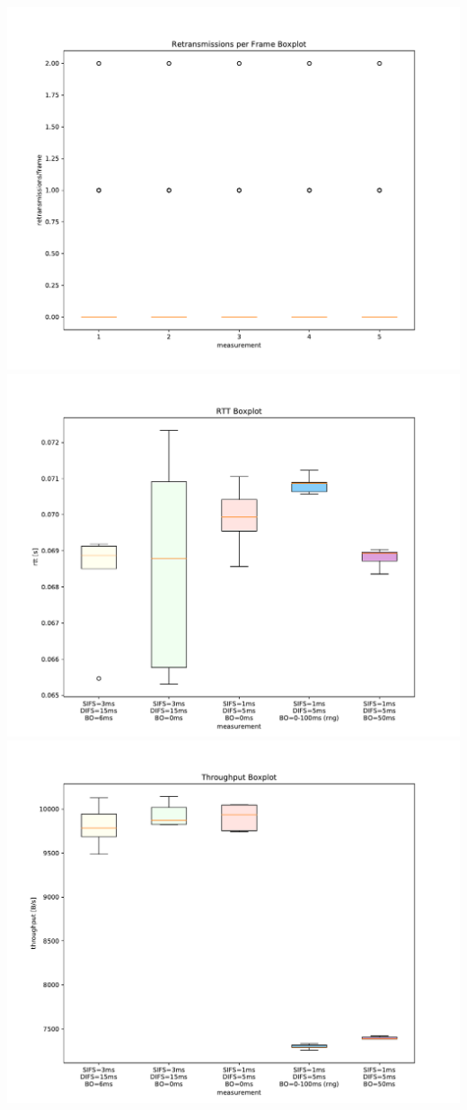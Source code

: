 \documentclass{article}
\begin{document}
	\includegraphics[width=\textwidth]{boxplot/retransmissions_per_frame_boxplot}
	\includegraphics[width=\textwidth]{boxplot/rtt_boxplot}
	\includegraphics[width=\textwidth]{boxplot/throughput_boxplot}
\end{document}
